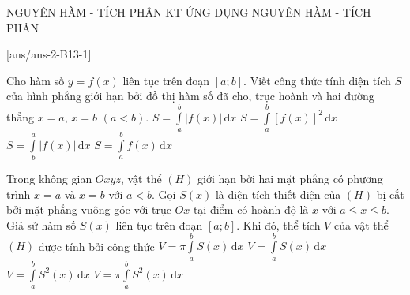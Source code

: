 \begin{name}
	{NGUYÊN HÀM - TÍCH PHÂN}
	{KT ỨNG DỤNG NGUYÊN HÀM - TÍCH PHÂN}
	{\tentruong}
	{\thoigian}
\end{name}
\setcounter{ex}{0}\setcounter{bt}{0}
[ans/ans-2-B13-1]
\caulc
\begin{ex}%
	Cho hàm số $y=f(x)$ liên tục trên đoạn $[a;b]$. Viết công thức tính diện tích $S$ của hình phẳng giới hạn bởi đồ thị hàm số đã cho, trục hoành và hai đường thẳng $x=a$, $x=b$ $(a<b)$.
	\choice
	{\True $S=\displaystyle\int\limits_a^b |f(x)|\mathrm{\,d}x$}
	{$S=\displaystyle\int\limits_a^b [f(x)]^2\mathrm{\,d}x$}
	{$S=\displaystyle\int\limits_b^a |f(x)|\mathrm{\,d}x$}
	{$S=\displaystyle\int\limits_a^b f(x)\mathrm{\,d}x$}
\end{ex}
\begin{ex}%
	Trong không gian $Oxyz$, vật thể $(H)$ giới hạn bởi hai mặt phẳng có phương trình $x=a$ và $x=b$ với $a<b$. Gọi $S(x)$ là diện tích thiết diện của $(H)$ bị cắt bởi mặt phẳng vuông góc với trục $Ox$ tại điểm có hoành độ là $x$ với $a\le x\le b$. Giả sử hàm số $S(x)$ liên tục trên đoạn $[a;b]$. Khi đó, thể tích $V$ của vật thể $(H)$ được tính bởi công thức
	\choice
	{$V=\pi\displaystyle\int\limits_a^bS(x)\mathrm{\,d}x$}
	{\True $V=\displaystyle\int\limits_a^bS(x)\mathrm{\,d}x$}
	{$V=\displaystyle\int\limits_a^bS^2(x)\mathrm{\,d}x$}
	{$V=\pi\displaystyle\int\limits_a^bS^2(x)\mathrm{\,d}x$}
\end{ex}
